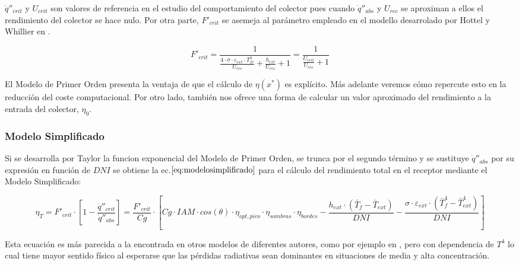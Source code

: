 \documentclass[11pt]{article}
\begin{document}
\(\dot q''_{crit}\) y \(U_{crit}\) son valores de referencia en el
estudio del comportamiento del colector pues cuando \(\dot q''_{abs}\) y
\(U_{rec}\) se aproximan a ellos el rendimiento del colector se hace
nulo. Por otra parte, \(F'_{crit}\) se asemeja al parámetro empleado en
el modello desarrolado por Hottel y Whillier en \cite{1022085/DVRL97SH}.

\begin{equation}
    F'_{crit} = \frac{1}{\frac{4 \cdot \sigma \cdot \varepsilon_{ext} \cdot T^{3}_{fe}}{U_{rec}} + \frac{h_{ext}}{U_{rec}} +1} = \frac{1}{\frac{U_{crit}}{U_{rec}}+1}
    \label{eq:fcrit}
\end{equation}

El Modelo de Primer Orden presenta la ventaja de que el cálculo de
\(\eta(x^{*})\) es explícito. Más adelante veremos cómo repercute esto
en la reducción del coste computacional. Por otro lado, también nos
ofrece una forma de calcular un valor aproximado del rendimiento a la
entrada del colector, \(\eta_{0}\).

\hypertarget{modelo-simplificado}{%
\subsubsection{Modelo Simplificado}\label{modelo-simplificado}}

Si se desarrolla por Taylor la funcion exponencial del Modelo de Primer
Orden, se trunca por el segundo término y se sustituye
\(\dot q''_{abs}\) por su expresión en función de \(DNI\) se obtiene la
ec.\(\eqref{eq:modelosimplificado}\) para el cálculo del rendimiento
total en el receptor mediante el Modelo Simplificado:

\begin{equation}
    \eta_{T} = F'_{crit} \cdot \left[1 - \frac{\dot q''_{crit}}{\dot q''_{abs}}\right] = \frac{F'_{crit}}{Cg} \cdot \left[Cg \cdot IAM \cdot cos(\theta) \cdot \eta_{opt,pico} \cdot \eta_{sombras} \cdot \eta_{bordes} - \frac{h_{ext}\cdot (\bar{T}_{f}-\bar{T}_{ext})}{DNI} - \frac{\sigma \cdot \varepsilon_{ext}\cdot(\bar{T}^{4}_{f}-\bar{T}^{4}_{ext})}{DNI}\right] 
    \label{eq:modelosimplificado}
\end{equation}

Esta ecuación es más parecida a la encontrada en otros modelos de
diferentes autores, como por ejemplo en
\cite{1022085/DVRL97SH}\cite{1022085/HI2ETXYA}, pero con dependencia de
\(T^{4}\) lo cual tiene mayor sentido físico al esperarse que las
pérdidas radiativas sean dominantes en situaciones de media y alta
concentración.
\end{document}
